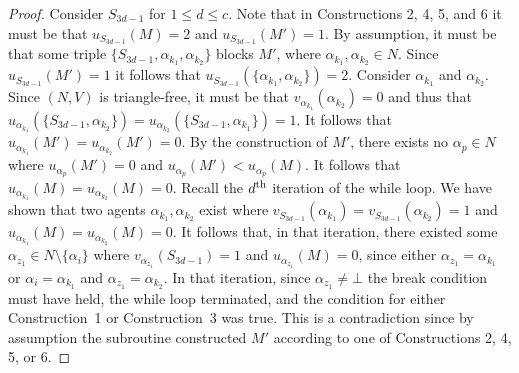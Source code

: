 \begin{proof}
Consider $S_{3d-1}$ for $1\leq d \leq c$. Note that in Constructions 2, 4, 5, and 6 it must be that $u_{S_{3d-1}}(M)=2$ and $u_{S_{3d-1}}(M')=1$. By assumption, it must be that some triple $\{ S_{3d-1}, \alpha_{k_1}, \alpha_{k_2} \}$ blocks $M'$, where $\alpha_{k_1}, \alpha_{k_2} \in N$. Since $u_{S_{3d-1}}(M')=1$ it follows that $u_{S_{3d-1}}(\{ \alpha_{k_1}, \alpha_{k_2} \})=2$. Consider $\alpha_{k_1}$ and $\alpha_{k_2}$. Since $(N, V)$ is triangle-free, it must be that $v_{\alpha_{k_1}}(\alpha_{k_2})=0$ and thus that $u_{\alpha_{k_1}}(\{ S_{3d-1}, \alpha_{k_2} \}) = u_{\alpha_{k_2}}(\{ S_{3d-1}, \alpha_{k_1} \}) = 1$. It follows that $u_{\alpha_{k_1}}(M') = u_{\alpha_{k_2}}(M') = 0$. By the construction of $M'$, there exists no $\alpha_p \in N$ where $u_{\alpha_p}(M') = 0$ and $u_{\alpha_p}(M') < u_{\alpha_p}(M)$. It follows that $u_{\alpha_{k_1}}(M)=u_{\alpha_{k_2}}(M)=0$. Recall the $d\textsuperscript{th}$ iteration of the while loop. We have shown that two agents $\alpha_{k_1}, \alpha_{k_2}$ exist where $v_{S_{3d-1}}(\alpha_{k_1})=v_{S_{3d-1}}(\alpha_{k_2})=1$ and $u_{\alpha_{k_1}}(M)=u_{\alpha_{k_2}}(M)=0$. It follows that, in that iteration, there existed some $\alpha_{z_1} \in N\setminus \{\alpha_i\}$ where $v_{\alpha_{z_1}}(S_{3d-1})=1$ and $u_{\alpha_{z_1}}(M)=0$, since either $\alpha_{z_1}=\alpha_{k_1}$ or $\alpha_{i}=\alpha_{k_1}$ and $\alpha_{z_1}=\alpha_{k_2}$. In that iteration, since $\alpha_{z_1}\neq \bot$ the break condition must have held, the while loop terminated, and the condition for either Construction~1 or Construction~3 was true. This is a contradiction since by assumption the subroutine constructed $M'$ according to one of Constructions 2, 4, 5, or 6.
\end{proof}

